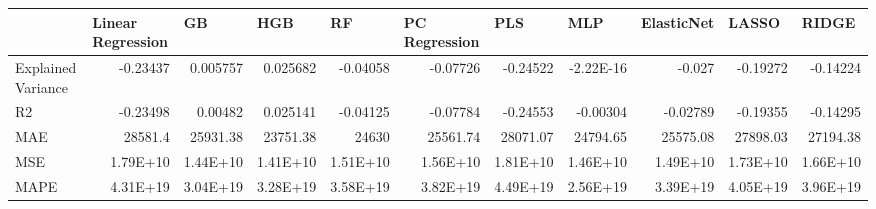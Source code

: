 \begin{tabular}{lrrrrrrrrrr}
\toprule
      & \multicolumn{1}{l}{Linear Regression} & \multicolumn{1}{l}{GB} & \multicolumn{1}{l}{HGB} & \multicolumn{1}{l}{RF} & \multicolumn{1}{l}{PC Regression} & \multicolumn{1}{l}{PLS} & \multicolumn{1}{l}{MLP} & \multicolumn{1}{l}{ElasticNet} & \multicolumn{1}{l}{LASSO} & \multicolumn{1}{l}{RIDGE} \\
\midrule
\midrule
Explained Variance & \cellcolor[rgb]{ .973,  .443,  .451}-0.23437 & \cellcolor[rgb]{ .506,  .647,  .831}0.005757 & \cellcolor[rgb]{ .353,  .541,  .776}0.025682 & \cellcolor[rgb]{ .851,  .894,  .953}-0.04058 & \cellcolor[rgb]{ .984,  .929,  .941}-0.07726 & \cellcolor[rgb]{ .973,  .412,  .42}-0.24522 & \cellcolor[rgb]{ .549,  .678,  .847}-2.22E-16 & \cellcolor[rgb]{ .749,  .82,  .918}-0.027 & \cellcolor[rgb]{ .976,  .573,  .58}-0.19272 & \cellcolor[rgb]{ .98,  .729,  .737}-0.14224 \\
R2    & \cellcolor[rgb]{ .973,  .443,  .451}-0.23498 & \cellcolor[rgb]{ .506,  .651,  .831}0.00482 & \cellcolor[rgb]{ .353,  .541,  .776}0.025141 & \cellcolor[rgb]{ .855,  .894,  .953}-0.04125 & \cellcolor[rgb]{ .984,  .929,  .941}-0.07784 & \cellcolor[rgb]{ .973,  .412,  .42}-0.24553 & \cellcolor[rgb]{ .565,  .69,  .851}-0.00304 & \cellcolor[rgb]{ .753,  .824,  .918}-0.02789 & \cellcolor[rgb]{ .976,  .573,  .58}-0.19355 & \cellcolor[rgb]{ .98,  .729,  .737}-0.14295 \\
MAE   & \cellcolor[rgb]{ .973,  .412,  .42}28581.4 & \cellcolor[rgb]{ .988,  .953,  .965}25931.38 & \cellcolor[rgb]{ .353,  .541,  .776}23751.38 & \cellcolor[rgb]{ .631,  .737,  .875}24630 & \cellcolor[rgb]{ .925,  .945,  .976}25561.74 & \cellcolor[rgb]{ .976,  .518,  .525}28071.07 & \cellcolor[rgb]{ .682,  .773,  .89}24794.65 & \cellcolor[rgb]{ .929,  .945,  .976}25575.08 & \cellcolor[rgb]{ .976,  .553,  .561}27898.03 & \cellcolor[rgb]{ .98,  .698,  .706}27194.38 \\
MSE   & \cellcolor[rgb]{ .976,  .447,  .455}1.79E+10 & \cellcolor[rgb]{ .502,  .647,  .827}1.44E+10 & \cellcolor[rgb]{ .353,  .541,  .776}1.41E+10 & \cellcolor[rgb]{ .851,  .89,  .949}1.51E+10 & \cellcolor[rgb]{ .988,  .933,  .945}1.56E+10 & \cellcolor[rgb]{ .973,  .412,  .42}1.81E+10 & \cellcolor[rgb]{ .561,  .686,  .847}1.46E+10 & \cellcolor[rgb]{ .749,  .82,  .914}1.49E+10 & \cellcolor[rgb]{ .98,  .576,  .584}1.73E+10 & \cellcolor[rgb]{ .984,  .733,  .741}1.66E+10 \\
MAPE  & \cellcolor[rgb]{ .976,  .545,  .553}4.31E+19 & \cellcolor[rgb]{ .62,  .729,  .871}3.04E+19 & \cellcolor[rgb]{ .753,  .824,  .918}3.28E+19 & \cellcolor[rgb]{ .922,  .941,  .976}3.58E+19 & \cellcolor[rgb]{ .988,  .902,  .914}3.82E+19 & \cellcolor[rgb]{ .973,  .412,  .42}4.49E+19 & \cellcolor[rgb]{ .353,  .541,  .776}2.56E+19 & \cellcolor[rgb]{ .816,  .867,  .937}3.39E+19 & \cellcolor[rgb]{ .984,  .737,  .749}4.05E+19 & \cellcolor[rgb]{ .984,  .8,  .812}3.96E+19 \\
\bottomrule
\bottomrule
\end{tabular}%
